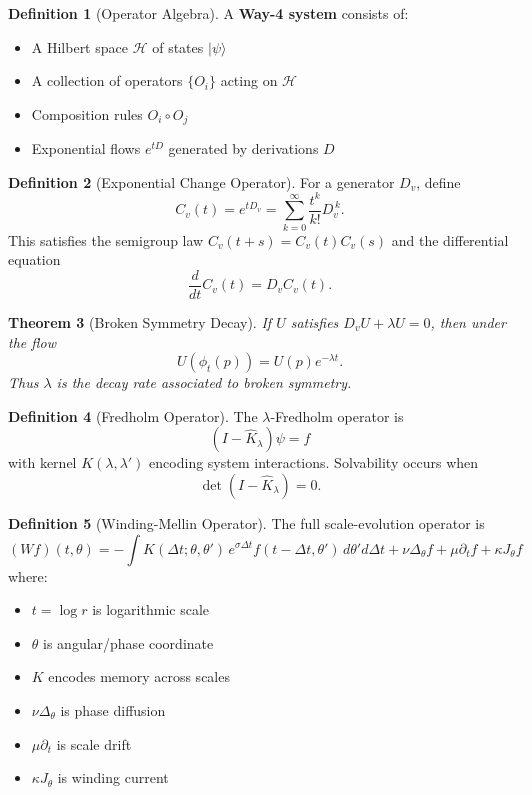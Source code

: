 \documentclass[12pt, reqno]{amsart}
\theoremstyle{plain}
\newtheorem{theorem}{Theorem}[section]
\theoremstyle{definition}
\newtheorem{definition}[theorem]{Definition}
\theoremstyle{remark}
\newcommand{\cH}{\mathcal{H}}
\newcommand{\fred}{\widehat{K}}
\newcommand{\eco}{C_{v}}
\newcommand{\ecoflow}{e^{tD_{v}}}
\begin{document}
\begin{definition}[Operator Algebra]
A \textbf{Way-4 system} consists of:
\begin{itemize}
    \item A Hilbert space $\cH$ of states $\mid \psi\rangle$
    \item A collection of operators $\{O_i\}$ acting on $\cH$
    \item Composition rules $O_i \circ O_j$
    \item Exponential flows $e^{tD}$ generated by derivations $D$
\end{itemize}
\end{definition}

\begin{definition}[Exponential Change Operator]
For a generator $D_v$, define
\[
\eco(t) = \ecoflow = \sum_{k=0}^{\infty} \frac{t^k}{k!} D_v^{\,k}.
\]
This satisfies the semigroup law $\eco(t+s) = \eco(t)\eco(s)$ and the differential equation
\[
\frac{d}{dt}\eco(t) = D_v\eco(t).
\]
\end{definition}

\begin{theorem}[Broken Symmetry Decay]
If $U$ satisfies $D_v U + \lambda U = 0$, then under the flow
\[
U(\phi_t(p)) = U(p)e^{-\lambda t}.
\]
Thus $\lambda$ is the decay rate associated to broken symmetry.
\end{theorem}

\begin{definition}[Fredholm Operator]
The $\lambda$-Fredholm operator is
\[
(I - \fred_{\lambda})\psi = f
\]
with kernel $K(\lambda,\lambda')$ encoding system interactions. Solvability occurs when
\[
\det(I - \fred_{\lambda}) = 0.
\]
\end{definition}

\begin{definition}[Winding-Mellin Operator]
The full scale-evolution operator is
\[
(Wf)(t,\theta) = -\int K(\Delta t;\theta,\theta')\, e^{\sigma\Delta t} f(t-\Delta t,\theta')\, d\theta' d\Delta t
+ \nu\Delta_{\theta}f + \mu\partial_t f + \kappa J_{\theta}f
\]
where:
\begin{itemize}
    \item $t = \log r$ is logarithmic scale
    \item $\theta$ is angular/phase coordinate
    \item $K$ encodes memory across scales
    \item $\nu\Delta_{\theta}$ is phase diffusion
    \item $\mu\partial_t$ is scale drift
    \item $\kappa J_{\theta}$ is winding current
\end{itemize}
\end{definition}
\end{document}
